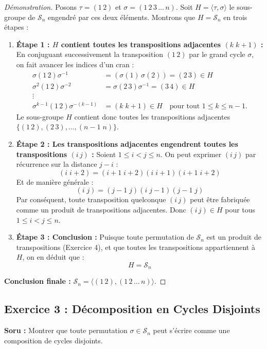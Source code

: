 \documentclass[12pt,a4paper]{report}
\begin{document}
\begin{proof}[Démonstration]
Posons $\tau = (1\,2)$ et $\sigma = (1\,2\,3\,\dots\,n)$. Soit $H = \langle \tau, \sigma \rangle$ le sous-groupe de $\mathcal{S}_n$ engendré par ces deux éléments.
Montrons que $H = \mathcal{S}_n$ en trois étapes :

\begin{enumerate}
    \item \textbf{Étape 1 : $H$ contient toutes les transpositions adjacentes $(k \; k+1)$ :}  
    En conjuguant successivement la transposition $(1\,2)$ par le grand cycle $\sigma$, on fait avancer les indices d'un cran :
    \begin{align*}
    \sigma (1\,2) \sigma^{-1} &= (\sigma(1) \, \sigma(2)) = (2\,3) \in H \\
    \sigma^2 (1\,2) \sigma^{-2} &= \sigma (2\,3) \sigma^{-1} = (3\,4) \in H \\
    \vdots \\
    \sigma^{k-1} (1\,2) \sigma^{-(k-1)} &= (k \; k+1) \in H \quad \text{pour tout } 1 \leq k \leq n-1.
    \end{align*}
    Le sous-groupe $H$ contient donc toutes les transpositions adjacentes $\{(1\,2), (2\,3), \dots, (n-1 \; n)\}$.

    \item \textbf{Étape 2 : Les transpositions adjacentes engendrent toutes les transpositions $(i\,j)$ :}  
    Soient $1 \leq i < j \leq n$. On peut exprimer $(i\,j)$ par récurrence sur la distance $j - i$ :
    \[ (i \; i+2) = (i+1 \; i+2)(i \; i+1)(i+1 \; i+2) \]
    Et de manière générale :
    \[ (i \; j) = (j-1 \; j) (i \; j-1) (j-1 \; j) \]
    Par conséquent, toute transposition quelconque $(i\,j)$ peut être fabriquée comme un produit de transpositions adjacentes. Donc $(i\,j) \in H$ pour tous $1 \leq i < j \leq n$.

    \item \textbf{Étape 3 : Conclusion :}  
    Puisque toute permutation de $\mathcal{S}_n$ est un produit de transpositions (Exercice 4), et que toutes les transpositions appartiennent à $H$, on en déduit que :
    \[ H = \mathcal{S}_n \]
\end{enumerate}
\textbf{Conclusion finale :} $\mathcal{S}_n = \langle (1\,2), (1\,2\,\dots\,n) \rangle$.
\end{proof}

\vspace{0.5cm}

\subsection*{Exercice 3 : Décomposition en Cycles Disjoints}
\textbf{Soru :} Montrer que toute permutation $\sigma \in \mathcal{S}_n$ peut s'écrire comme une composition de cycles disjoints.
\end{document}
